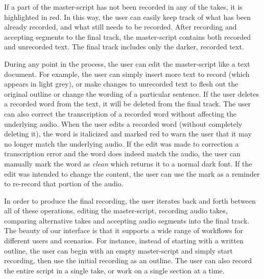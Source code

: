 If a part of the master-script has not been recorded in any of the takes, it is highlighted in red. In this way, the user can easily keep track of what has been already recorded, and what still needs to be recorded. After recording and accepting segments to the final track, the master-script contains both recorded and unrecorded text.
The final track includes only the darker, recorded text. 

 During any point in the process, the user can edit the master-script like a text document.
For example, the user can simply insert
more text to record (which appears in light grey), or make changes
to unrecorded text to flesh out the original outline
or change the wording of a particular sentence. If the user deletes a recorded word from the text, it will be deleted from the final track. The user can also correct the transcription of a recorded word without affecting the underlying audio. When the user edits a recorded word (without completely deleting it), the word is italicized and marked red to warn the user that it may no longer match the underlying audio. If the edit was made to correction a transcription error and the word does indeed match the audio, the user can manually mark the word as \textit{clean} which returns it to a normal dark font. If the edit was intended to change the content, the user can use the mark as a reminder to re-record that portion of the audio.

   

In order to produce the final recording, the user iterates back and forth between all of these operations, editing the master-script, recording audio takes, comparing alternative takes and accepting audio segments into the final track.
The beauty of our interface is that it supports a wide range of workflows for different users and scenarios. For instance, instead of starting with a written outline, the user can begin with an empty master-script and simply start recording,  then use  the initial recording as an outline. The user can also record the entire script in a single take, or work on a single section at a time. 
